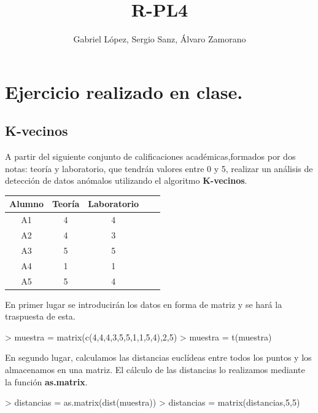 \documentclass [a4paper] {article}
\title{R-PL4}
\author{Gabriel López, Sergio Sanz, Álvaro Zamorano}
\begin{document}


\maketitle

\graphicspath{ {./tmp/} }

\section{Ejercicio realizado en clase.}

\subsection{K-vecinos}
\bigskip
A partir del siguiente conjunto de calificaciones académicas,formados por dos notas: teoría y laboratorio, 
que tendrán valores entre 0 y 5, realizar un análisis de detección de datos anómalos utilizando el algoritmo
\textbf{K-vecinos}.

\begin{table}[H]
\begin{center}
\begin{tabular}{|c|c|c|c|c|}
\hline
Alumno & Teoría & Laboratorio\\
\hline \hline
A1 & 4 & 4 \\ \hline
A2 & 4 & 3 \\ \hline
A3 & 5 & 5 \\ \hline
A4 & 1 & 1 \\ \hline
A5 & 5 & 4 \\ \hline
\end{tabular}
\end{center}
\end{table}

En primer lugar se introducirán los datos en forma de matriz y se hará la traspuesta de esta.
\begin{Schunk}
\begin{Sinput}
> muestra = matrix(c(4,4,4,3,5,5,1,1,5,4),2,5)
> muestra = t(muestra)
\end{Sinput}
\end{Schunk}

\bigskip
En segundo lugar, calculamos las distancias euclídeas entre todos los puntos y los almacenamos 
en una matriz. El cálculo de las distancias lo realizamos mediante la función \textbf{as.matrix}. 

\bigskip
\begin{Schunk}
\begin{Sinput}
> distancias = as.matrix(dist(muestra))
> distancias = matrix(distancias,5,5)
\end{Sinput}
\end{Schunk}
\end{document}
